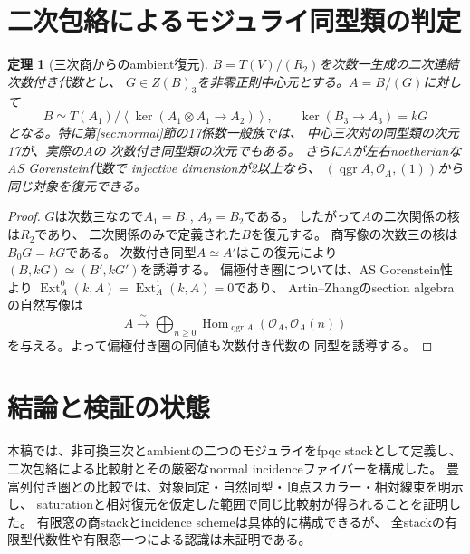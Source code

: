 \documentclass[11pt,a4paper]{ltjsarticle}
\numberwithin{equation}{section}
\newtheorem{theorem}{定理}[section]
\newcommand{\OO}{\mathcal O}
\newcommand{\qgr}{\operatorname{qgr}}
\begin{document}









\section{二次包絡によるモジュライ同型類の判定}\label{sec:moduli-iso}
\begin{theorem}[三次商からのambient復元]\label{thm:moduli-iso}
$B=T(V)/(R_2)$を次数一生成の二次連結次数付き代数とし、
$G\in Z(B)_3$を非零正則中心元とする。$A=B/(G)$に対して
\begin{equation}\label{eq:moduli-envelope}
 B\simeq T(A_1)/
 \left\langle\ker(A_1\otimes A_1\longrightarrow A_2)\right\rangle,
 \qquad \ker(B_3\longrightarrow A_3)=kG
\end{equation}
となる。特に第\ref{sec:normal}節の17係数一般族では、
中心三次対の同型類の次元17が、実際の$A$の
次数付き同型類の次元でもある。
さらに$A$が左右noetherianなAS Gorenstein代数で
injective dimensionが2以上なら、
$(\qgr A,\OO_A,(1))$から同じ対象を復元できる。
\end{theorem}
\begin{proof}
$G$は次数三なので$A_1=B_1$, $A_2=B_2$である。
したがって$A$の二次関係の核は$R_2$であり、
二次関係のみで定義された$B$を復元する。
商写像の次数三の核は$B_0G=kG$である。
次数付き同型$A\simeq A'$はこの復元により
$(B,kG)\simeq(B',kG')$を誘導する。
偏極付き圏については、AS Gorenstein性より
$\operatorname{Ext}_A^0(k,A)=\operatorname{Ext}_A^1(k,A)=0$であり、
Artin--Zhangのsection algebraの自然写像は
\begin{equation}\label{eq:moduli-section}
 A\xrightarrow{\ \sim\ }\bigoplus_{n\ge0}
 \operatorname{Hom}_{\qgr A}(\OO_A,\OO_A(n))
\end{equation}
を与える。よって偏極付き圏の同値も次数付き代数の
同型を誘導する。
\end{proof}





\section{結論と検証の状態}\label{sec:status}
本稿では、非可換三次とambientの二つのモジュライをfpqc stackとして定義し、
二次包絡による比較射とその厳密なnormal incidenceファイバーを構成した。
豊富列付き圏との比較では、対象同定・自然同型・頂点スカラー・相対線束を明示し、
saturationと相対復元を仮定した範囲で同じ比較射が得られることを証明した。
有限窓の商stackとincidence schemeは具体的に構成できるが、
全stackの有限型代数性や有限窓一つによる認識は未証明である。
\end{document}
